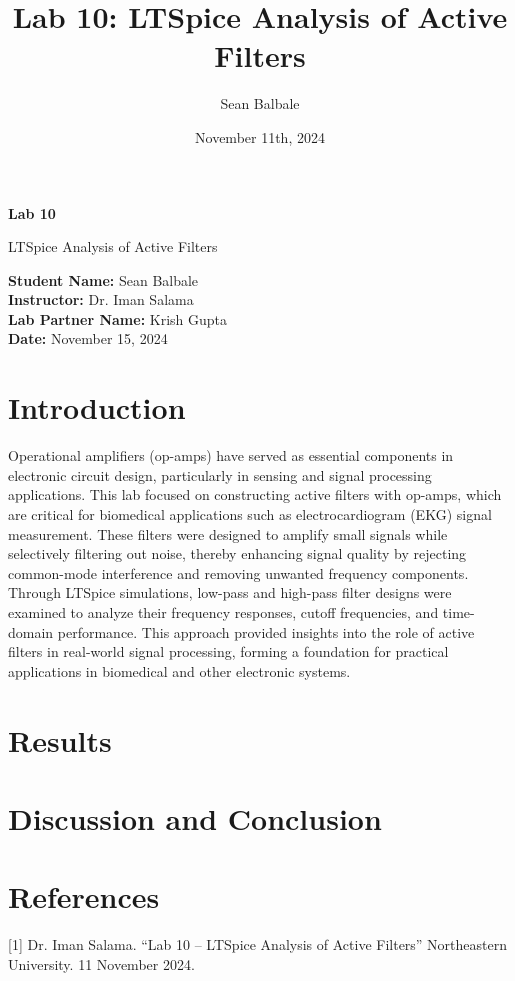 \documentclass[12pt]{article}
\title{Lab 10: LTSpice Analysis of Active Filters}
\author{Sean Balbale}
\date{November 11th, 2024}
\begin{document}
\begin{titlepage}
	\begin{center}
		\vspace*{1in}

		\Huge
		\textbf{Lab 10}

		\LARGE
		LTSpice Analysis of Active Filters

		\vspace{3 in}

		\textbf{Student Name:} Sean Balbale
		\\ \textbf{Instructor:} Dr. Iman Salama
		\\ \textbf{Lab Partner Name:} Krish Gupta
		\\ \textbf{Date:} November 15, 2024

		\vfill


	\end{center}
\end{titlepage}

\newpage

\section{Introduction} 
Operational amplifiers (op-amps) have served as essential components in
electronic circuit design, particularly in sensing and signal processing
applications. This lab focused on constructing active filters with op-amps,
which are critical for biomedical applications such as electrocardiogram (EKG)
signal measurement. These filters were designed to amplify small signals while
selectively filtering out noise, thereby enhancing signal quality by rejecting
common-mode interference and removing unwanted frequency components. Through
LTSpice simulations, low-pass and high-pass filter designs were examined to
analyze their frequency responses, cutoff frequencies, and time-domain
performance. This approach provided insights into the role of active filters in
real-world signal processing, forming a foundation for practical applications in
biomedical and other electronic systems.



\section{Results}




\section{Discussion and Conclusion}


\section{References}
 [1] Dr. Iman Salama. “Lab 10 – LTSpice Analysis of Active Filters” Northeastern University. 11 November 2024.
\end{document}

